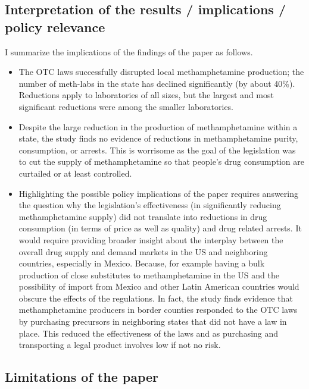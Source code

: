 \documentclass[
  11pt,
]{article}
\begin{document}
\hypertarget{interpretation-of-the-results-implications-policy-relevance}{%
\subsection*{Interpretation of the results / implications / policy
relevance}\label{interpretation-of-the-results-implications-policy-relevance}}

I summarize the implications of the findings of the paper as follows.

\begin{itemize}
\item
  The OTC laws successfully disrupted local methamphetamine production;
  the number of meth-labs in the state has declined significantly (by
  about 40\%). Reductions apply to laboratories of all sizes, but the
  largest and most significant reductions were among the smaller
  laboratories.
\item
  Despite the large reduction in the production of methamphetamine
  within a state, the study finds no evidence of reductions in
  methamphetamine purity, consumption, or arrests. This is worrisome as
  the goal of the legislation was to cut the supply of methamphetamine
  so that people's drug consumption are curtailed or at least
  controlled.
\item
  Highlighting the possible policy implications of the paper requires
  answering the question why the legislation's effectiveness (in
  significantly reducing methamphetamine supply) did not translate into
  reductions in drug consumption (in terms of price as well as quality)
  and drug related arrests. It would require providing broader insight
  about the interplay between the overall drug supply and demand markets
  in the US and neighboring countries, especially in Mexico. Because,
  for example having a bulk production of close substitutes to
  methamphetamine in the US and the possibility of import from Mexico
  and other Latin American countries would obscure the effects of the
  regulations. In fact, the study finds evidence that methamphetamine
  producers in border counties responded to the OTC laws by purchasing
  precursors in neighboring states that did not have a law in place.
  This reduced the effectiveness of the laws and as purchasing and
  transporting a legal product involves low if not no risk.
\end{itemize}

\hypertarget{limitations-of-the-paper}{%
\subsection*{Limitations of the paper}\label{limitations-of-the-paper}}
\end{document}
